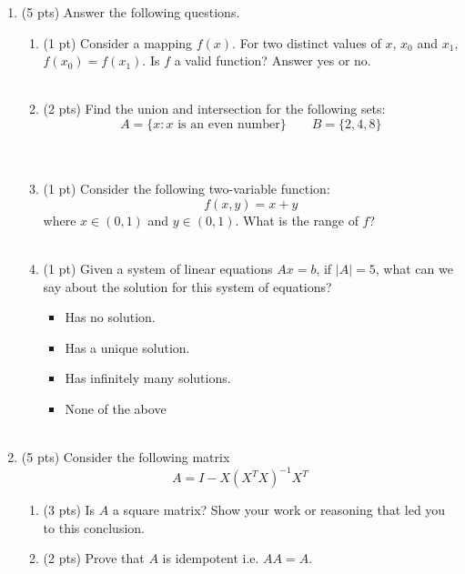 \documentclass{./../../latex/tests}
\begin{document}
\thispagestyle{plain}

\vspace{0.5em}

\begin{enumerate}
\item (5 pts) Answer the following questions. 
\begin{enumerate}
\item (1 pt) Consider a mapping $f(x)$. For two distinct values of $x$, $x_0$ and $x_1$, $f(x_0) = f(x_1)$. Is $f$ a valid function? Answer yes or no. \\~\\
\item (2 pts) Find the union and intersection for the following sets:
\[ A = \{x: x \text{ is an even number} \} \quad \quad B = \{2, 4, 8 \} \] \\~\\
\item (1 pt) Consider the following two-variable function: 
  \[ f(x,y) = x+y \]
  where $x \in (0,1)$ and $y \in (0,1)$. What is the range of $f$? \\~\\
 
\item (1 pt) Given a system of linear equations $A x = b$, if $|A|=5$, what can we say about the solution for this system of equations?
\begin{itemize}
	\item[$\square$] Has no solution. 
	\item[$\square$] Has a unique solution.
	\item[$\square$] Has infinitely many solutions.
	\item[$\square$] None of the above \\~\\
\end{itemize}  
\end{enumerate} 

\newpage
\item (5 pts) Consider the following matrix \[A = I - X(X^T X)^{-1}X^T \]
\begin{enumerate}
\item (3 pts)  Is $A$ a square matrix? Show your work or reasoning that led you to this conclusion. \vspace{2.5cm}
\item (2 pts) Prove that $A$ is idempotent i.e. $A A = A$. \vspace{5cm}
\end{enumerate} 


\end{enumerate}
\end{document}
